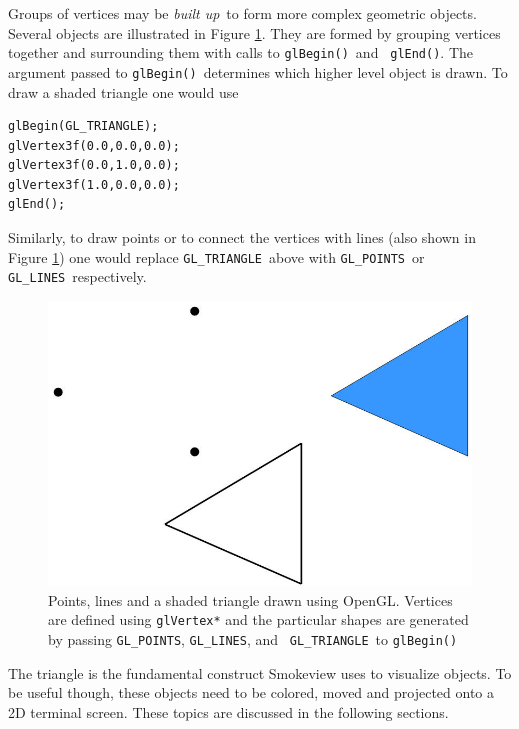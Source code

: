 \documentclass[11pt,twoside]{book}
\newcommand{\figoptions}{htp}
\begin{document}
Groups of vertices may be {\em built up}\ to form more complex geometric objects.
Several objects are illustrated in Figure \ref{figshapes}.  They are formed by grouping vertices together
and surrounding them with calls to {\tt glBegin()}\ and {\tt
glEnd()}. The argument passed to {\tt glBegin()}\ determines which higher level object is drawn.
To draw a shaded triangle one would use
\begin{verbatim}
glBegin(GL_TRIANGLE);
glVertex3f(0.0,0.0,0.0);
glVertex3f(0.0,1.0,0.0);
glVertex3f(1.0,0.0,0.0);
glEnd();
\end{verbatim}
Similarly, to draw points or to connect the vertices with lines (also shown
in Figure \ref{figshapes}) one would replace {\tt GL\_TRIANGLE}\ above
with {\tt GL\_POINTS}\ or {\tt GL\_LINES}\ respectively.
\begin{figure}[\figoptions]
\begin{center}
\includegraphics[width=6.0in]{figures/shapes}
\end{center}
\caption[Points, lines and a shaded triangle drawn using OpenGL.]
{Points, lines and a shaded triangle drawn using OpenGL. Vertices
are defined using {\tt glVertex*} and the particular shapes are
generated by passing {\tt GL\_POINTS}, {\tt GL\_LINES}, and {\tt
GL\_TRIANGLE}\ to {\tt glBegin()} } \label{figshapes}
\end{figure}

The triangle is the fundamental construct Smokeview uses to
visualize objects.  To be useful though, these objects need to be
colored, moved and projected onto a 2D terminal screen. These
topics are discussed in the following sections.

%
%
\end{document}
